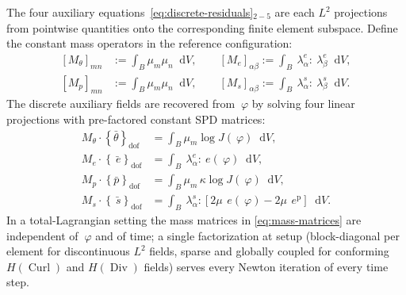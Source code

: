 \documentclass[12pt]{article}
\newcommand{\edev}{~e}
\newcommand{\ebar}{\bar{~e}}
\newcommand{\sbar}{\bar{~s}}
\newcommand{\thbar}{\bar{\theta}}
\newcommand{\pbar}{\bar{p}}
\DeclareMathOperator{\Div}{Div}
\DeclareMathOperator{\Curl}{Curl}
\newcommand*\diff{\mathop{}\!\mathrm{d}}
\begin{document}
The four auxiliary equations~\eqref{eq:discrete-residuals}$_{2-5}$
are each $L^2$ projections from pointwise quantities onto the
corresponding finite element subspace. Define the constant mass
operators in the reference configuration:
\begin{equation}
  \label{eq:mass-matrices}
  \begin{split}
    \left[M_\theta\right]_{mn} & := \int_B \mu_m \mu_n \diff V,
    \qquad
    \left[M_e\right]_{\alpha\beta} := \int_B ~\lambda^e_\alpha : ~\lambda^e_\beta \diff V,
    \\
    \left[M_p\right]_{mn} & := \int_B \mu_m \mu_n \diff V,
    \qquad
    \left[M_s\right]_{\alpha\beta} := \int_B ~\lambda^s_\alpha : ~\lambda^s_\beta \diff V.
  \end{split}
\end{equation}
The discrete auxiliary fields are recovered from $~\varphi$ by
solving four linear projections with pre-factored constant SPD
matrices:
\begin{equation}
  \label{eq:projections}
  \begin{split}
    M_\theta \cdot \left\{\thbar\right\}_{\mathrm{dof}}
    & =
    \int_B \mu_m \log J(~\varphi) \diff V,
    \\
    M_e \cdot \left\{\ebar\right\}_{\mathrm{dof}}
    & =
    \int_B ~\lambda^e_\alpha : \edev(~\varphi) \diff V,
    \\
    M_p \cdot \left\{\pbar\right\}_{\mathrm{dof}}
    & =
    \int_B \mu_m \, \kappa \log J(~\varphi) \diff V,
    \\
    M_s \cdot \left\{\sbar\right\}_{\mathrm{dof}}
    & =
    \int_B ~\lambda^s_\alpha : \left[2\mu \, \edev(~\varphi) - 2\mu \, \edev^{\mathrm{p}}\right] \diff V.
  \end{split}
\end{equation}
In a total-Lagrangian setting the mass matrices in
\eqref{eq:mass-matrices} are independent of $~\varphi$ and of time;
a single factorization at setup (block-diagonal per element for
discontinuous $L^2$ fields, sparse and globally coupled for
conforming $H(\Curl)$ and $H(\Div)$ fields) serves every Newton
iteration of every time step.
\end{document}
